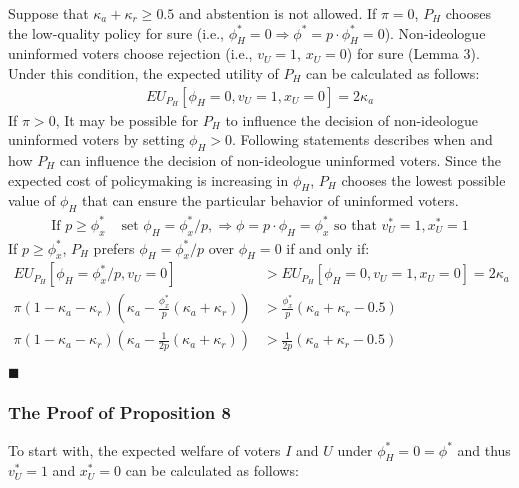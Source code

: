 \par Suppose that $\kappa_a + \kappa_r \geq 0.5$ and abstention is not allowed. If $\pi=0$, $P_H$ chooses the low-quality policy for sure (i.e., $\phi^*_H=0 \Rightarrow \phi^* = p \cdot \phi^*_H = 0$). Non-ideologue uninformed voters choose rejection (i.e., $v_U=1$, $x_U=0$) for sure (Lemma 3). Under this condition, the expected utility of $P_H$ can be calculated as follows:
\begin{align*}
EU_{P_H}[\phi_H=0, v_U=1, x_U=0] = 2 \kappa_a
\end{align*}
\noindent If $\pi>0$, It may be possible for $P_H$ to influence the decision of non-ideologue uninformed voters by setting $\phi_H>0$. Following statements describes when and how $P_H$ can influence the decision of non-ideologue uninformed voters. Since the expected cost of policymaking is increasing in $\phi_H$, $P_H$ chooses the lowest possible value of $\phi_H$ that can ensure the particular behavior of uninformed voters.  
\begin{align*}
\text{If } p \geq \phi^*_{x} &\text{ set } \phi_H = \phi^*_{x}/p, \Rightarrow \phi = p \cdot \phi_H = \phi^*_{x} \text{ so that } v^*_U = 1, x^*_U = 1 
\end{align*}
\noindent If $p \geq \phi^*_{x}$, $P_H$ prefers $\phi_H = \phi^*_{x}/p$ over $\phi_H = 0$ if and only if:
\begin{align*}
EU_{P_H}[\phi_H = \phi^*_{x}/p, v_U = 0] &> EU_{P_H}[\phi_H=0, v_U=1, x_U=0] = 2 \kappa_a \\ 
\pi (1-\kappa_a-\kappa_r)\left(\kappa_a - \frac{\phi^*_{x}}{p}(\kappa_a + \kappa_r)\right) &> \frac{\phi^*_{x}}{p} (\kappa_a + \kappa_r - 0.5) \\
\pi (1-\kappa_a-\kappa_r)\left(\kappa_a - \frac{1}{2p}(\kappa_a + \kappa_r)\right) &> \frac{1}{2p} (\kappa_a + \kappa_r - 0.5)
\end{align*}

\hfill $\blacksquare$

\subsubsection{The Proof of Proposition 8}

\par To start with, the expected welfare of voters $I$ and $U$ under $\phi^*_H=0=\phi^*$ and thus $v^*_U=1$ and $x^*_U=0$ can be calculated as follows:

